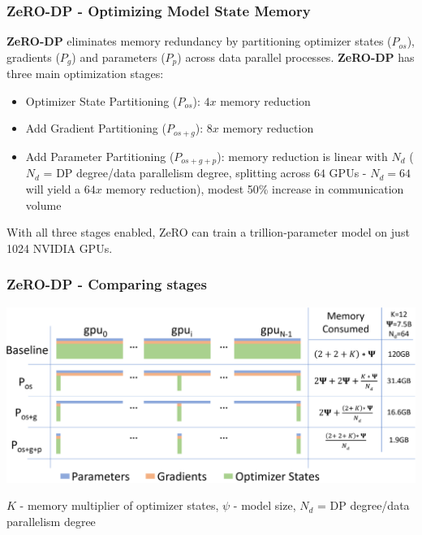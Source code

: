 \documentclass{beamer}
\begin{document}
\begin{frame}
    \frametitle{ZeRO-DP - Optimizing Model State Memory}
    \textbf{ZeRO-DP} eliminates memory redundancy by partitioning optimizer states ($P_{os}$), gradients ($P_{g}$) and parameters ($P_{p}$) across data parallel processes. \textbf{ZeRO-DP} has three main optimization stages:
    \begin{itemize}
        \item Optimizer State Partitioning ($P_{os}$): $4x$ memory reduction
        \item Add Gradient Partitioning ($P_{os+g}$): $8x$ memory reduction
        \item Add Parameter Partitioning ($P_{os+g+p}$): memory reduction is linear with $N_d$ ($N_d$ = DP degree/data parallelism degree, splitting across $64$ GPUs - $N_d = 64$ will yield a $64x$ memory reduction), modest 50\% increase in communication volume
    \end{itemize}

    With all three stages enabled, ZeRO can train a trillion-parameter model on just 1024 NVIDIA GPUs.
\end{frame}

\begin{frame}
    \frametitle{ZeRO-DP - Comparing stages}
    \begin{center}
        \includegraphics[scale=0.25]{img/zero_memory_consumption.png}
    \end{center}
    \footnotesize{$ K $ - memory multiplier of optimizer states, \textbf{$\psi$} - model size, $N_d$ = DP degree/data parallelism degree}
\end{frame}
\end{document}
